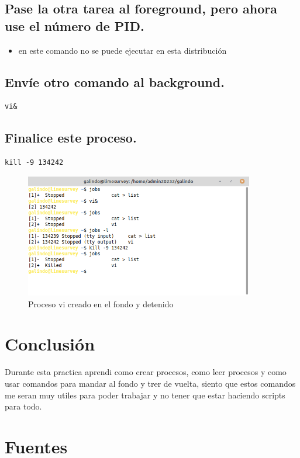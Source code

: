 \documentclass[11pt]{article}
\begin{document}
\subsection{Pase la otra tarea al foreground, pero ahora use el número de PID.}
\label{sec:orgad44142}
\begin{itemize}
\item en este comando no se puede ejecutar en esta distribución
\end{itemize}

\subsection{Envíe otro comando al background.}
\label{sec:orge5c8d90}
\begin{verbatim}
vi&
\end{verbatim}

\subsection{Finalice este proceso.}
\label{sec:org3de0cac}
\begin{verbatim}
kill -9 134242
\end{verbatim}

\begin{figure}[htbp]
\centering
\includegraphics[width=10cm]{img/vi.png}
\caption{Proceso vi creado en el fondo y detenido}
\end{figure}

\section{Conclusión}
\label{sec:orgf66df9f}
Durante esta practica aprendi como crear procesos, como leer procesos y como usar 
comandos para mandar al fondo y trer de vuelta, siento que estos comandos me 
seran muy utiles para poder trabajar y no tener que estar haciendo scripts para
todo.

\section{Fuentes}
\label{sec:org2948f26}
\printbibliography[heading=none]
\end{document}
